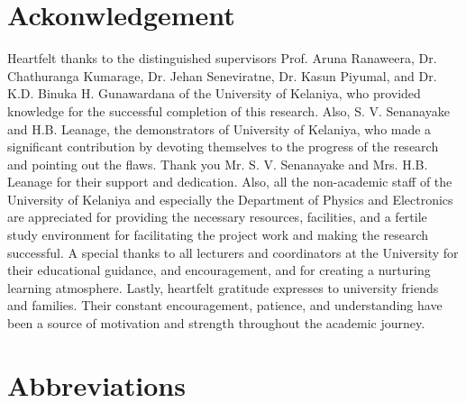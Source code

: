\documentclass[11pt]{report}	%
\begin{document}
\newpage
{}
\chapter*{Ackonwledgement}
Heartfelt thanks to the distinguished supervisors Prof. Aruna Ranaweera, Dr. Chathuranga Kumarage, Dr. Jehan Seneviratne, Dr. Kasun Piyumal, and Dr. K.D. Binuka H. Gunawardana of the University of Kelaniya, who provided knowledge for the successful completion of this research.
Also, S. V. Senanayake and H.B. Leanage, the demonstrators of University of Kelaniya, who made a significant contribution by devoting themselves to the progress of the research and pointing out the flaws. Thank you Mr. S. V. Senanayake and Mrs. H.B. Leanage for their support and dedication.
Also, all the non-academic staff of the University of Kelaniya and especially the Department of Physics and Electronics are appreciated for providing the necessary resources, facilities, and a fertile study environment for facilitating the project work and making the research successful.
A special thanks to all lecturers and coordinators at the University for their educational guidance, and encouragement, and for creating a nurturing learning atmosphere. 
Lastly, heartfelt gratitude expresses to university friends and families. Their constant encouragement, patience, and understanding have been a source of motivation and strength throughout the academic journey. 




\clearpage
\newpage %

\tableofcontents %

\clearpage

\newpage %
\listoffigures

\clearpage


\newpage
{}
\listoftables

\clearpage


\newpage
{}
\chapter*{Abbreviations}
\end{document}
